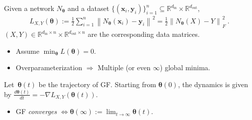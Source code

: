 \documentclass[handout,usenames,dvipsnames]{beamer} %
\newcommand{\din}{{d_{\text{in}}}}
\newcommand{\dout}{{d_{\text{out}}}}
\newcommand{\norm}[2][]{{\left\|{#2}\right\|_{#1}}}
\newcommand{\bx}{\mathbf{x}}
\newcommand{\by}{\mathbf{y}}
\newcommand{\btheta}{{\boldsymbol{\theta}}}
\newcommand{\reals}{{\mathbb R}}
\begin{document}
\begin{frame}
    \pause
    \begin{definition}
        
        Given a network $N_\btheta$ and a dataset $\{(\bx_i,\by_i)\}_{i=1}^n \subseteq \reals^\din \times \reals^\dout$,
        \begin{align*} \label{eq:objective}
        	 L_{X,Y}(\btheta) 
        	 := \frac{1}{2} \sum_{i=1}^n \norm{N_\btheta(\bx_i) - \by_i}^2
        	 = \frac{1}{2} \norm{N_\btheta(X) - Y}_F^2~.
        \end{align*}
        $(X,Y) \in \reals^{\din \times n} \times \reals^{\dout \times n}$ are the corresponding data matrices.
    \end{definition}
    \pause
    \begin{itemize}
            \item Assume $\min_\btheta L(\btheta)=0$.
            \pause
            \item Overparameterization $\Rightarrow$ Multiple (or even $\infty$) global minima.
        \end{itemize}
    \pause
    \begin{definition}
        Let~$\btheta(t)$ be the trajectory of GF. Starting from $\btheta(0)$, the dynamics is given by $\frac{d \btheta(t)}{dt} = -\nabla L_{X,Y}(\btheta(t))$.
    \end{definition}
    \begin{itemize}
        \pause
        \item GF \emph{converges} $\Leftrightarrow \btheta(\infty) := \lim_{t \to \infty}\btheta(t)$.
    \end{itemize}
    

\end{frame}
\end{document}
